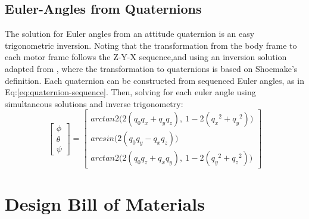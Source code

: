 \section{Euler-Angles from Quaternions}
\label{app:equations.quaternions}
The solution for Euler angles from an attitude quaternion is an easy trigonometric inversion. Noting that the transformation from the body frame to each motor frame follows the Z-Y-X sequence,and using an inversion solution adapted from \cite{computingeuler}, where the transformation to quaternions is based on Shoemake's\cite{shoemake} definition. Each quaternion can be constructed from sequenced Euler angles, as in Eq:\ref{eq:quaternion-sequence}.
Then, solving for each euler angle using simultaneous solutions and inverse trigonometry:
\begin{equation}\label{eq:app-quaternion-eule}
\begin{bmatrix}
\phi\\
\theta\\
\psi
\end{bmatrix}
=
\begin{bmatrix}
arctan2\big(2(q_0q_x+q_yq_z),~1-2(q_x\text{}^2+q_y\text{}^2)\big)\\
arcsin\big(2(q_0q_y-q_xq_z)\big)\\
arctan2\big(2(q_0q_z+q_xq_y),~1-2(q_y\text{}^2+q_z\text{}^2)\big)
\end{bmatrix}
\end{equation}
\chapter{Design Bill of Materials}
\label{app:bom}
